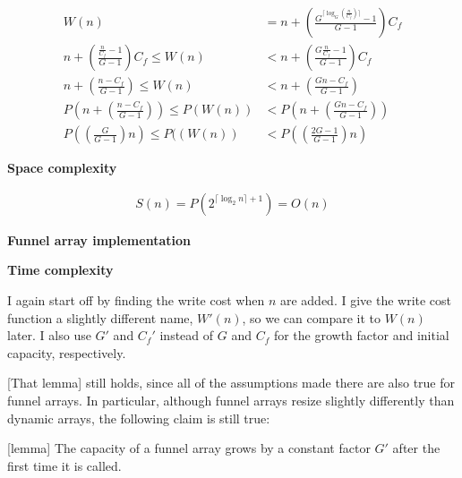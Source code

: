\documentclass{article}
\newcommand{\funarrayimpl}{\textbf{Funnel array implementation}}
\newcommand{\tcomplex}{\textbf{Time complexity}}
\newcommand{\scomplex}{\textbf{Space complexity}}
\newcommand{\spacefn}{S}
\newcommand{\nwritesfn}{W}
\newcommand{\nwritesnewfn}{\nwritesfn'}
\newcommand{\bigo}{O}
\newcommand{\biggo}{P}
\newcommand{\varnitems}{n}
\newcommand{\initcapacity}{C_f}
\newcommand{\growthfactor}{G}
\newcommand{\initcapacitynew}{\initcapacity'}
\newcommand{\growthfactornew}{\growthfactor'}
\begin{document}
	\begin{align*}
	\nwritesfn(\varnitems) &= \varnitems + \left( \frac{\growthfactor^{\big\lceil \log_{\growthfactor} \left( \frac {\varnitems} {\initcapacity} \right) \big\rceil} - 1}{\growthfactor - 1} \right) \initcapacity\\
	\varnitems + \left( \frac{\frac{\varnitems}{\initcapacity} - 1}{\growthfactor - 1} \right) \initcapacity \leq \nwritesfn(\varnitems) &< \varnitems + \left( \frac{\growthfactor\frac{\varnitems}{\initcapacity} - 1}{\growthfactor - 1} \right) \initcapacity\\
	\varnitems + \left( \frac{\varnitems - \initcapacity}{\growthfactor - 1} \right) \leq \nwritesfn(\varnitems) &< \varnitems + \left( \frac{\growthfactor\varnitems - \initcapacity}{\growthfactor - 1} \right)\\
	\biggo\left( \varnitems + \left( \frac{\varnitems - \initcapacity}{\growthfactor - 1} \right) \right) \leq \biggo\left( \nwritesfn(\varnitems) \right) &< \biggo\left( \varnitems + \left( \frac{\growthfactor\varnitems - \initcapacity}{\growthfactor - 1} \right) \right)\\
	\biggo\left( \left( \frac{\growthfactor}{\growthfactor - 1} \right) \varnitems \right) \leq \biggo(\left( \nwritesfn(\varnitems) \right) &< \biggo\left( \left( \frac{2\growthfactor - 1}{\growthfactor - 1} \right) \varnitems \right)
	\end{align*}
	
	\scomplex
	
	\begin{align*}
	\spacefn(\varnitems) = \biggo(2^{\lceil \log_2 \varnitems \rceil + 1}) = \bigo(\varnitems)
	\end{align*}
	
	\funarrayimpl
	
	\tcomplex
	
	I again start off by finding the write cost when $\varnitems$ are added. I give the write cost function a slightly different name, $\nwritesnewfn(\varnitems)$, so we can compare it to $\nwritesfn(\varnitems)$ later. I also use $\growthfactornew$ and $\initcapacitynew$ instead of $\growthfactor$ and $\initcapacity$ for the growth factor and initial capacity, respectively.
	
	[That lemma] still holds, since all of the assumptions made there are also true for funnel arrays. In particular, although funnel arrays resize slightly differently than dynamic arrays, the following claim is still true:
	
	[lemma]
	The capacity of a funnel array grows by a constant factor $\growthfactornew$ after the first time it is called.
	
\end{document}
